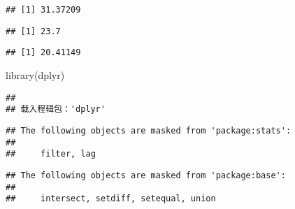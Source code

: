\documentclass[
  12pt,
]{article}
\newenvironment{Shaded}{\begin{snugshade}}{\end{snugshade}}
\newcommand{\AttributeTok}[1]{\textcolor[rgb]{0.77,0.63,0.00}{#1}}
\newcommand{\FunctionTok}[1]{\textcolor[rgb]{0.00,0.00,0.00}{#1}}
\newcommand{\NormalTok}[1]{#1}
\newcommand{\SpecialCharTok}[1]{\textcolor[rgb]{0.00,0.00,0.00}{#1}}
\begin{document}
\begin{Shaded}
\end{Shaded}

\begin{verbatim}
## [1] 31.37209
\end{verbatim}

\begin{Shaded}
\end{Shaded}

\begin{verbatim}
## [1] 23.7
\end{verbatim}

\begin{Shaded}
\end{Shaded}

\begin{verbatim}
## [1] 20.41149
\end{verbatim}

\begin{Shaded}
\begin{Highlighting}[]
\FunctionTok{library}\NormalTok{(dplyr)}
\end{Highlighting}
\end{Shaded}

\begin{verbatim}
## 
## 载入程辑包：'dplyr'
\end{verbatim}

\begin{verbatim}
## The following objects are masked from 'package:stats':
## 
##     filter, lag
\end{verbatim}

\begin{verbatim}
## The following objects are masked from 'package:base':
## 
##     intersect, setdiff, setequal, union
\end{verbatim}

\begin{Shaded}
\end{Shaded}
\end{document}
